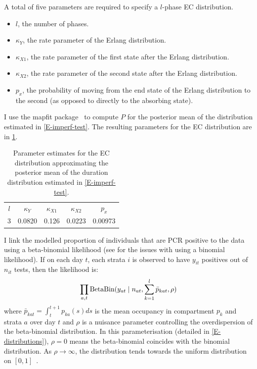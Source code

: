 \documentclass[thesis.tex]{subfiles}
\begin{document}
A total of five parameters are required to specify a $l$-phase EC distribution.
\begin{itemize}
    \item $l$, the number of phases.
    \item $\kappa_Y$, the rate parameter of the Erlang distribution.
    \item $\kappa_{X1}$, the rate parameter of the first state after the Erlang distribution.
    \item $\kappa_{X2}$, the rate parameter of the second state after the Erlang distribution.
    \item $p_x$, the probability of moving from the end state of the Erlang distribution to the second (as opposed to directly to the absorbing state).
\end{itemize}

I use the mapfit package~\autocite{mapfit} to compute $P$ for the posterior mean of the distribution estimated in \cref{E-imperf-test}.
The resulting parameters for the EC distribution are in \cref{SEIR:table:ec-params}.
\begin{table}
    \centering
    \begin{tabular}{c c c c c}
        $l$ & $\kappa_Y$ & $\kappa_{X1}$ & $\kappa_{X2}$ & $p_x$ \\
        3 & 0.0820 & 0.126 & 0.0223 & 0.00973  \\
    \end{tabular}
    \caption{Parameter estimates for the EC distribution approximating the posterior mean of the duration distribution estimated in \cref{E-imperf-test}.}
    \label{SEIR:table:ec-params}
\end{table}

I link the modelled proportion of individuals that are PCR positive to the data using a beta-binomial likelihood (see for the issues with using a binomial likelihood).
If on each day $t$, each strata $i$ is observed to have $y_{it}$ positives out of $n_{it}$ tests, then the likelihood is:
\begin{align}
    \prod_{a,t} \operatorname{BetaBin} (y_{at} \mid n_{at}, \sum_{k=1}^l \bar{p}_{kat}, \rho)
    \label{SEIR:eq:likelihood}
\end{align}
where $\bar{p}_{kat} = \int_{t}^{t+1} p_{ka}(s) ds$ is the mean occupancy in compartment $p_k$ and strata $a$ over day $t$ and $\rho$ is a nuisance parameter controlling the overdispersion of the beta-binomial distribution.
In this parameterisation (detailed in \cref{E-distributions}), $\rho=0$ means the beta-binomial coincides with the binomial distribution.
As $\rho \to \infty$, the distribution tends towards the uniform distribution on $[0, 1]$~\autocite{hughesUsing}.
\end{document}
